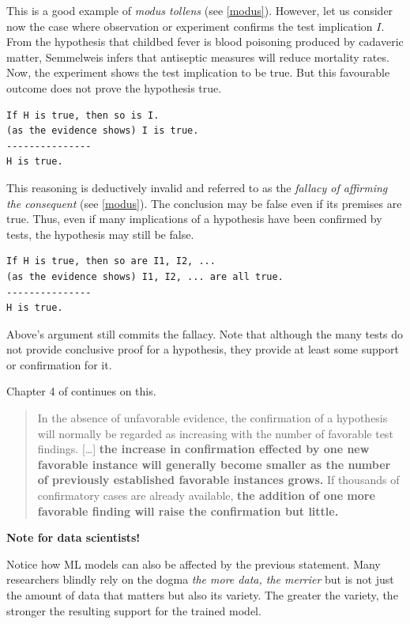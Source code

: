 \documentclass[
  12pt,
]{book}
\newenvironment{rnote}{\par\raggedleft}{\par}
\begin{document}
This is a good example of \emph{modus tollens} (see \ref{modus}). However, let us consider now the case where observation or experiment confirms the test implication \(I\). From the hypothesis that childbed fever is blood poisoning produced by cadaveric matter, Semmelweis infers that antiseptic measures will reduce mortality rates. Now, the experiment shows the test implication to be true. But this favourable outcome does not prove the hypothesis true.

\begin{verbatim}
If H is true, then so is I.
(as the evidence shows) I is true.
---------------
H is true.
\end{verbatim}

This reasoning is deductively invalid and referred to as the \emph{fallacy of affirming the consequent} (see \ref{modus}). The conclusion may be false even if its premises are true. Thus, even if many implications of a hypothesis have been confirmed by tests, the hypothesis may still be false.

\begin{verbatim}
If H is true, then so are I1, I2, ...
(as the evidence shows) I1, I2, ... are all true.
---------------
H is true.
\end{verbatim}

Above's argument still commits the fallacy. Note that although the many tests do not provide conclusive proof for a hypothesis, they provide at least some support or confirmation for it.

\begin{rnote}
Chapter 4 of \citep{hempel-pos} continues on this.

\end{rnote}

\begin{quote}
In the absence of unfavorable evidence, the confirmation of a hypothesis will normally be regarded as increasing with the number of favorable test findings. {[}\ldots{]} \textbf{the increase in confirmation effected by one new favorable instance will generally become smaller as the number of previously established favorable instances grows.} If thousands of confirmatory cases are already available, \textbf{the addition of one more favorable finding will raise the confirmation but little.}
\end{quote}

\begin{tipbox}

\textbf{Note for data scientists!}

Notice how ML models can also be affected by the previous statement. Many researchers blindly rely on the dogma \emph{the more data, the merrier} but is not just the amount of data that matters but also its variety. The greater the variety, the stronger the resulting support for the trained model.

\end{tipbox}
\end{document}
